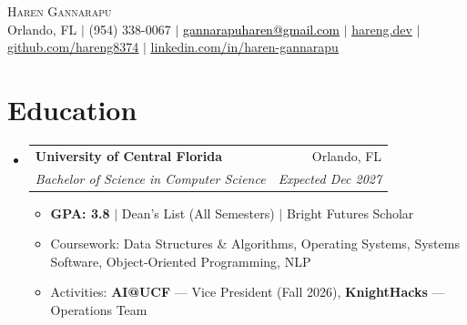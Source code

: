 \documentclass[letterpaper,10pt]{article}
\makeatletter
\newcommand{\headerlink}[2]{\textcolor{blue}{\underline{\href{#1}{#2}}}}
\newcommand{\resumeItem}[1]{\item\small{#1\vspace{-1pt}}}
\newcommand{\resumeSubheading}[4]{%
  \vspace{5pt}\item
  \begin{tabular*}{0.97\textwidth}{l@{\extracolsep{\fill}}r}
    \textbf{#1} & \small #2 \\
    \textit{\small #3} & \textit{\small #4}
  \end{tabular*}\vspace{-5pt}}
\newcommand{\resumeSubHeadingListStart}{\begin{itemize}[leftmargin=0.15in,label={},topsep=0pt,partopsep=0pt,parsep=0pt,itemsep=0pt]}
\newcommand{\resumeSubHeadingListEnd}{\end{itemize}\vspace{-3pt}}
\newcommand{\resumeItemListStart}{\begin{itemize}[leftmargin=*,topsep=1pt,itemsep=0pt,parsep=0pt]}
\newcommand{\resumeItemListEnd}{\end{itemize}\vspace{-5pt}}
\makeatother
\begin{document}

\begin{center}
  {\LARGE \scshape Haren Gannarapu} \\[1pt]
  \small Orlando, FL $\vert$ (954) 338-0067 $\vert$
  \href{mailto:gannarapuharen@gmail.com}{\textcolor{black}{gannarapuharen@gmail.com}} $\vert$
  \headerlink{https://hareng.dev}{hareng.dev} $\vert$
  \headerlink{https://github.com/hareng8374}{github.com/hareng8374} $\vert$
  \headerlink{https://www.linkedin.com/in/haren-gannarapu}{linkedin.com/in/haren-gannarapu}
\end{center}
\vspace{-6pt}

\section{Education}
\resumeSubHeadingListStart
  \resumeSubheading{University of Central Florida}{Orlando, FL}{Bachelor of Science in Computer Science}{Expected Dec 2027}
  \resumeItemListStart
    \resumeItem{\textbf{GPA: 3.8} $|$ Dean's List (All Semesters) $|$ Bright Futures Scholar}
    \resumeItem{Coursework: Data Structures \& Algorithms, Operating Systems, Systems Software, Object-Oriented Programming, NLP}
    \resumeItem{Activities: \textbf{AI@UCF} --- Vice President (Fall 2026), \textbf{KnightHacks} --- Operations Team}
  \resumeItemListEnd
\resumeSubHeadingListEnd

\end{document}
